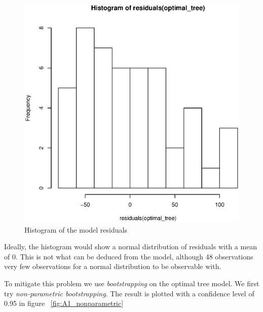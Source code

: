 \documentclass[a4paper,12pt]{article}
\begin{document}
    \begin{figure}[H]

    \centering
    \includegraphics[width=\textwidth]{figures/A1_historgram_residuals}  
    \caption{Histogram of the model residuals \label{fig:A1_historgram_residuals}}
    \end{figure}
    Ideally, the histogram would show a normal distribution of residuals with a mean of 0. This is not what can be deduced from the model, although 48 observations very few observations for a normal distribution to be observable with.

    To mitigate this problem we use \textit{bootstrapping} on the optimal tree model. We first try \textit{non-parametric bootstrapping}. The result is plotted with a confidence level of 0.95 in figure ~\ref{fig:A1_nonparametric}
\end{document}
